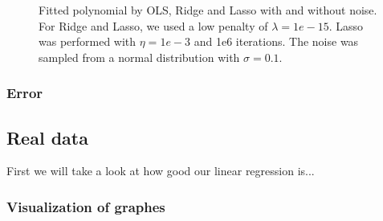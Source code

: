 \begin{figure} [H]
    \caption{Fitted polynomial by OLS, Ridge and Lasso with and without noise. For Ridge and Lasso, we used a low penalty of $\lambda=1e-15$. Lasso was performed with $\eta=1e-3$ and 1e6 iterations. The noise was sampled from a normal distribution with $\sigma=0.1$.}%
    \label{fig:franke_plots}%
\end{figure}

\restoregeometry

\subsubsection{Error}


\subsection{Real data}
First we will take a look at how good our linear regression is...
\subsubsection{Visualization of graphes}

